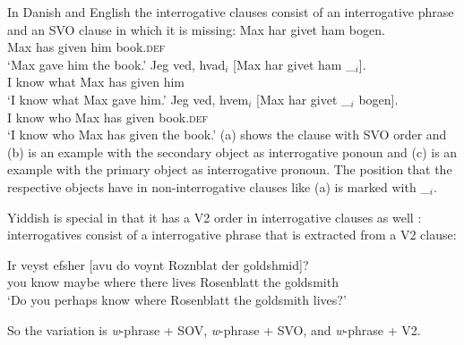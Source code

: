 In Danish and English the interrogative clauses consist of an interrogative phrase and an SVO clause
in which it is missing:
\eal
\ex 
\gll Max har givet ham bogen.\\
     Max has given him book.\textsc{def}\\
\glt `Max gave him the book.'
\ex
\gll Jeg ved, hvad$_i$ [Max har givet ham \_$_i$].\\
     I know what \spacebr{}Max has given him\\
\glt `I know what Max gave him.'
\ex
\gll Jeg ved, hvem$_i$ [Max har givet \_$_i$   bogen].\\
     I know who        \spacebr{}Max has given {} book.\textsc{def}\\
\glt `I know who Max has given the book.'
\zl
(a) shows the clause with SVO order and (b) is an example with the secondary object as
interrogative ponoun and (c) is an example with the primary object as interrogative
pronoun. The position that the respective objects have in non-interrogative clauses like (a)
is marked with \_$_i$.

Yiddish is special in that it has a V2 order in interrogative clauses as well \citep[Sections~4.1, 4.2]{Diesing90a}: interrogatives
consist of a interrogative phrase that is extracted from a V2 clause:

\ea
\gll Ir veyst efsher [avu            do    voynt Roznblat   der goldshmid]?\footnotemark\\
     you know maybe  \spacebr{}where there lives Rosenblatt the goldsmith\\
\glt `Do you perhaps know where Rosenblatt the goldsmith lives?' 
\z


So the variation is \emph{w}-phrase + SOV, \emph{w}-phrase + SVO, and \emph{w}-phrase + V2.


